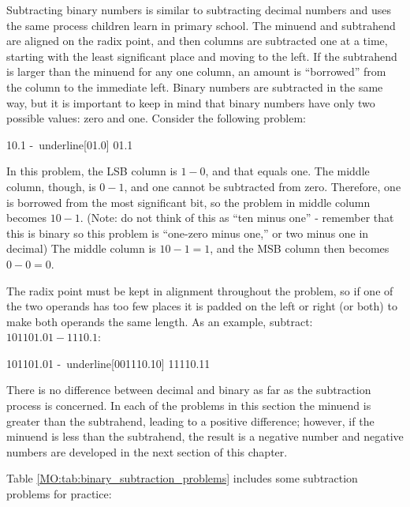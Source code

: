 Subtracting binary numbers is similar to subtracting decimal numbers and uses the same process children learn in primary school. The minuend and subtrahend are aligned on the radix point, and then columns are subtracted one at a time, starting with the least significant place and moving to the left. If the subtrahend is larger than the minuend for any one column, an amount is ``borrowed'' from the column to the immediate left. Binary numbers are subtracted in the same way, but it is important to keep in mind that binary numbers have only two possible values: zero and one. Consider the following problem: 

\begin{binDisp}[commandchars=~\[\]]
      10.1
     -~underline[01.0]
      01.1
\end{binDisp}

In this problem, the \ac{LSB} column is $ 1 - 0 $, and that equals one. The middle column, though, is $ 0 - 1 $, and one cannot be subtracted from zero. Therefore, one is borrowed from the most significant bit, so the problem in middle column becomes $ 10 - 1 $. (Note: do not think of this as ``ten minus one'' - remember that this is binary so this problem is ``one-zero minus one,'' or two minus one in decimal) The middle column is $ 10 - 1 = 1 $, and the \ac{MSB} column then becomes $ 0 - 0 = 0 $. 

The radix point must be kept in alignment throughout the problem, so if one of the two operands has too few places it is padded on the left or right (or both) to make both operands the same length. As an example, subtract: $ 101101.01 - 1110.1 $: 

\begin{binDisp}[commandchars=~\[\], samepage=true]
      101101.01
     -~underline[001110.10]
       11110.11
\end{binDisp}

There is no difference between decimal and binary as far as the subtraction process is concerned. In each of the problems in this section the minuend is greater than the subtrahend, leading to a positive difference; however, if the minuend is less than the subtrahend, the result is a negative number and negative numbers are developed in the next section of this chapter. 

Table \ref{MO:tab:binary_subtraction_problems} includes some subtraction problems for practice: 

